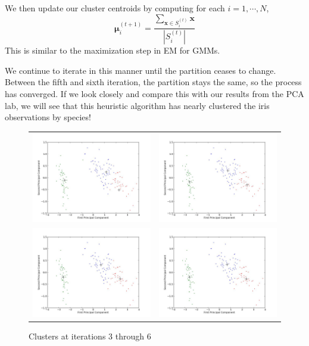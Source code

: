 We then update our cluster centroids by computing for each $i = 1, \cdots, N$,
\begin{equation*}
\mathbf{\mu}_{i}^{(t+1)} = \frac{\sum_{\mathbf{x} \in S_{i}^{(t)}} \mathbf{x}}{|S_{i}^{(t)}|}
\end{equation*}
This is similar to the maximization step in EM for GMMs.

We continue to iterate in this manner until the partition ceases to change. Between the fifth and sixth iteration, the partition stays the same, so the process has converged. If we look closely and compare this with our results from the PCA lab, we will see that this heuristic algorithm has nearly clustered the iris observations by species!

\begin{figure}[h]
	\centering
	\begin{tabular}{cc}
	\includegraphics[width=.49\textwidth]{iteration3.jpg} & 
	\includegraphics[width=.49\textwidth]{iteration4.jpg} \\
	\includegraphics[width=.49\textwidth]{iteration5.jpg} & 
	\includegraphics[width=.49\textwidth]{iteration6.jpg}
	\end{tabular}
	\caption{Clusters at iterations 3 through 6}
\end{figure}

